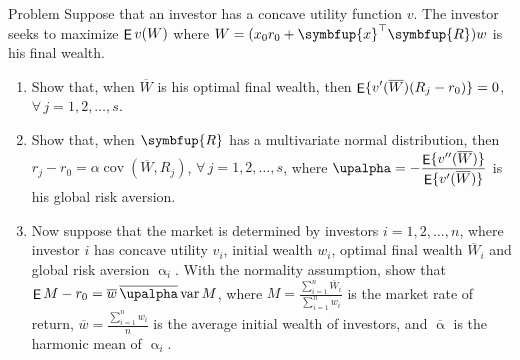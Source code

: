 \documentclass[10pt]{beamer}
\newcommand{\ds}{\displaystyle}
\newcommand{\vx}{\symbfup{x}}
\newcommand{\vR}{\symbfup{R}}
\DeclareMathOperator\expc{{\sf E}}
\DeclareMathOperator\var{var}
\DeclareMathOperator\cov{cov}
\theoremstyle{definition}
\begin{document}
\begin{frame}{Problem}
  Suppose that an investor has a concave utility function $v$. The investor seeks to maximize $\expc v(W)$ where $\ds W = (x_0 r_0 + \vx^\top\vR)w$ is his final wealth.
  \begin{enumerate}
    \item Show that, when $\overline{W}$ is his optimal final wealth, then $\ds\expc\{v'(\overline{W})(R_j - r_0)\} = 0$, $\forall\,j = 1, 2, \ldots, s$.
    \item Show that, when $\vR$ has a multivariate normal distribution, then $\ds r_j - r_0 = \alpha\cov(\overline{W}, R_j)$, $\forall\,j = 1, 2, \ldots, s$, where $\ds\upalpha = -\frac{\expc\{v''(\overline{W})\}}{\expc\{v'(\overline{W})\}}$ is his global risk aversion.
    \item Now suppose that the market is determined by investors $i = 1, 2, \ldots, n$, where investor $i$ has concave utility $v_i$, initial wealth $w_i$, optimal final wealth $\overline{W}_i$ and global risk aversion $\upalpha_i$. With the normality assumption, show that $\ds\expc M - r_0 = \overline{w}\,\overline{\upalpha}\var M$, where $\ds M = \frac{\sum_{i=1}^n\overline{W}_i}{\sum_{i=1}^n w_i}$ is the market rate of return, $\ds\overline{w} = \frac{\sum_{i=1}^n w_i}{n}$ is the average initial wealth of investors, and $\overline{\upalpha}$ is the harmonic mean of $\upalpha_i$.
  \end{enumerate}
\end{frame}
\end{document}
